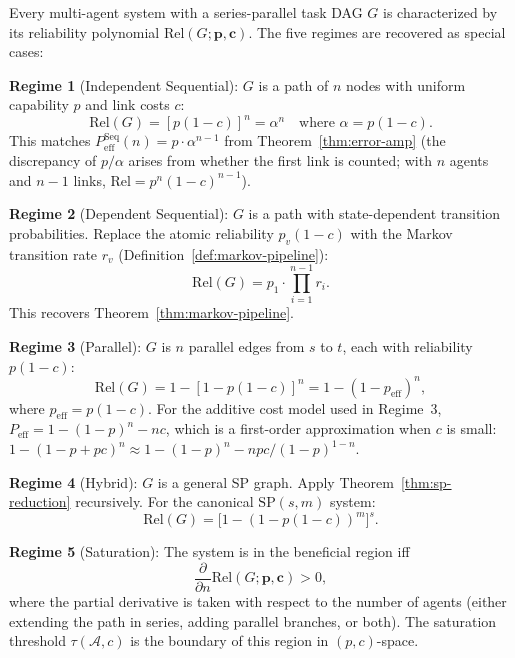 \begin{theorem}
\label{thm:unified-scaling-law}
Every multi-agent system with a series-parallel task DAG $G$ is characterized by its
reliability polynomial $\mathrm{Rel}(G; \mathbf{p}, \mathbf{c})$. The five regimes
are recovered as special cases:

\medskip
\noindent\textbf{Regime 1} (Independent Sequential): $G$ is a path of $n$ nodes with
uniform capability $p$ and link costs $c$:
\[
  \mathrm{Rel}(G) = [p(1-c)]^n = \alpha^n
  \quad\text{where } \alpha = p(1-c).
\]
This matches $P_{\mathrm{eff}}^{\mathrm{Seq}}(n) = p \cdot \alpha^{n-1}$ from
Theorem~\ref{thm:error-amp} (the discrepancy of $p/\alpha$ arises from whether the
first link is counted; with $n$ agents and $n-1$ links,
$\mathrm{Rel} = p^n(1-c)^{n-1}$).

\medskip
\noindent\textbf{Regime 2} (Dependent Sequential): $G$ is a path with
state-dependent transition probabilities. Replace the atomic reliability $p_v(1-c)$
with the Markov transition rate $r_v$ (Definition~\ref{def:markov-pipeline}):
\[
  \mathrm{Rel}(G) = p_1 \cdot \prod_{i=1}^{n-1} r_i.
\]
This recovers Theorem~\ref{thm:markov-pipeline}.

\medskip
\noindent\textbf{Regime 3} (Parallel): $G$ is $n$ parallel edges from $s$ to $t$,
each with reliability $p(1-c)$:
\[
  \mathrm{Rel}(G) = 1 - [1 - p(1-c)]^n = 1 - (1-p_{\mathrm{eff}})^n,
\]
where $p_{\mathrm{eff}} = p(1-c)$. For the additive cost model used in
Regime~3, $P_{\mathrm{eff}} = 1 - (1-p)^n - nc$, which is a first-order
approximation when $c$ is small:
$1 - (1-p+pc)^n \approx 1 - (1-p)^n - npc/(1-p)^{1-n}$.

\medskip
\noindent\textbf{Regime 4} (Hybrid): $G$ is a general SP graph. Apply
Theorem~\ref{thm:sp-reduction} recursively. For the canonical $\mathrm{SP}(s,m)$
system:
\[
  \mathrm{Rel}(G) = \bigl[1 - (1 - p(1-c))^m\bigr]^s.
\]

\medskip
\noindent\textbf{Regime 5} (Saturation): The system is in the beneficial region iff
\[
  \frac{\partial}{\partial n} \mathrm{Rel}(G; \mathbf{p}, \mathbf{c}) > 0,
\]
where the partial derivative is taken with respect to the number of agents
(either extending the path in series, adding parallel branches, or both). The
saturation threshold $\tau(\mathcal{A}, c)$ is the boundary of this region in
$(p, c)$-space.
\end{theorem}

